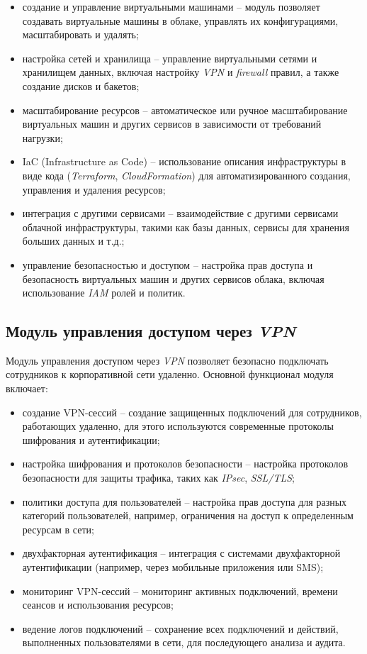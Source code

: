 \begin{itemize}
    \item создание и управление виртуальными машинами -- модуль позволяет создавать виртуальные машины в облаке, управлять их конфигурациями, масштабировать и удалять; 
    \item настройка сетей и хранилища -- управление виртуальными сетями и хранилищем данных, включая настройку \textit{VPN} и \textit{firewall} правил, а также создание дисков и бакетов; 
    \item масштабирование ресурсов -- автоматическое или ручное масштабирование виртуальных машин и других сервисов в зависимости от требований нагрузки; 
    \item IaC (Infrastructure as Code) -- использование описания инфраструктуры в виде кода (\textit{Terraform}, \textit{CloudFormation}) для автоматизированного создания, управления и удаления ресурсов; 
    \item интеграция с другими сервисами -- взаимодействие с другими сервисами облачной инфраструктуры, такими как базы данных, сервисы для хранения больших данных и т.д.; 
    \item управление безопасностью и доступом -- настройка прав доступа и безопасность виртуальных машин и других сервисов облака, включая использование \textit{IAM} ролей и политик. 
\end{itemize}

\subsection{Модуль управления доступом через \textit{VPN}}
\label{sec:vpn_access_functionality}

Модуль управления доступом через \textit{VPN} позволяет безопасно подключать сотрудников к корпоративной сети удаленно. Основной функционал модуля включает:

\begin{itemize}
    \item создание VPN-сессий -- создание защищенных подключений для сотрудников, работающих удаленно, для этого используются современные протоколы шифрования и аутентификации; 
    \item настройка шифрования и протоколов безопасности -- настройка протоколов безопасности для защиты трафика, таких как \textit{IPsec}, \textit{SSL/TLS}; 
    \item политики доступа для пользователей -- настройка прав доступа для разных категорий пользователей, например, ограничения на доступ к определенным ресурсам в сети; 
    \item двухфакторная аутентификация -- интеграция с системами двухфакторной аутентификации (например, через мобильные приложения или SMS); 
    \item мониторинг VPN-сессий -- мониторинг активных подключений, времени сеансов и использования ресурсов; 
    \item ведение логов подключений -- сохранение всех подключений и действий, выполненных пользователями в сети, для последующего анализа и аудита. 
\end{itemize}

